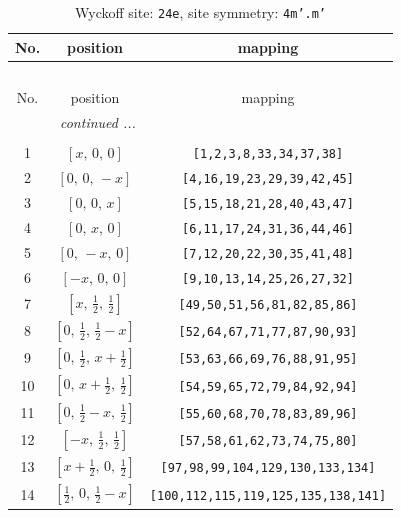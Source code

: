 \documentclass[fleqn,8pt]{jsarticle}
\begin{document}
\begin{longtable}{ccc}
\caption{Wyckoff site: {\tt 24e}, site symmetry: {\tt 4m'.m'}}
 \\
 \hline \hline
No. & position & mapping \\ \hline \endfirsthead

\multicolumn{2}{l}{\tablename\ \thetable{}} \\
 \hline \hline
No. & position & mapping \\ \hline \endhead

 \hline \hline
\multicolumn{2}{r}{\footnotesize\it continued ...} \\ \endfoot

 \hline \hline
\multicolumn{2}{r}{} \\ \endlastfoot

1 & $\left[ x,\, 0,\, 0 \right]$ & {\tt [1,2,3,8,33,34,37,38]} \\ \hline
2 & $\left[ 0,\, 0,\, - x \right]$ & {\tt [4,16,19,23,29,39,42,45]} \\ \hline
3 & $\left[ 0,\, 0,\, x \right]$ & {\tt [5,15,18,21,28,40,43,47]} \\ \hline
4 & $\left[ 0,\, x,\, 0 \right]$ & {\tt [6,11,17,24,31,36,44,46]} \\ \hline
5 & $\left[ 0,\, - x,\, 0 \right]$ & {\tt [7,12,20,22,30,35,41,48]} \\ \hline
6 & $\left[ - x,\, 0,\, 0 \right]$ & {\tt [9,10,13,14,25,26,27,32]} \\ \hline
7 & $\left[ x,\, \frac{1}{2},\, \frac{1}{2} \right]$ & {\tt [49,50,51,56,81,82,85,86]} \\ \hline
8 & $\left[ 0,\, \frac{1}{2},\, \frac{1}{2} - x \right]$ & {\tt [52,64,67,71,77,87,90,93]} \\ \hline
9 & $\left[ 0,\, \frac{1}{2},\, x + \frac{1}{2} \right]$ & {\tt [53,63,66,69,76,88,91,95]} \\ \hline
10 & $\left[ 0,\, x + \frac{1}{2},\, \frac{1}{2} \right]$ & {\tt [54,59,65,72,79,84,92,94]} \\ \hline
11 & $\left[ 0,\, \frac{1}{2} - x,\, \frac{1}{2} \right]$ & {\tt [55,60,68,70,78,83,89,96]} \\ \hline
12 & $\left[ - x,\, \frac{1}{2},\, \frac{1}{2} \right]$ & {\tt [57,58,61,62,73,74,75,80]} \\ \hline
13 & $\left[ x + \frac{1}{2},\, 0,\, \frac{1}{2} \right]$ & {\tt [97,98,99,104,129,130,133,134]} \\ \hline
14 & $\left[ \frac{1}{2},\, 0,\, \frac{1}{2} - x \right]$ & {\tt [100,112,115,119,125,135,138,141]} \\ \hline

\end{longtable}
\end{document}
